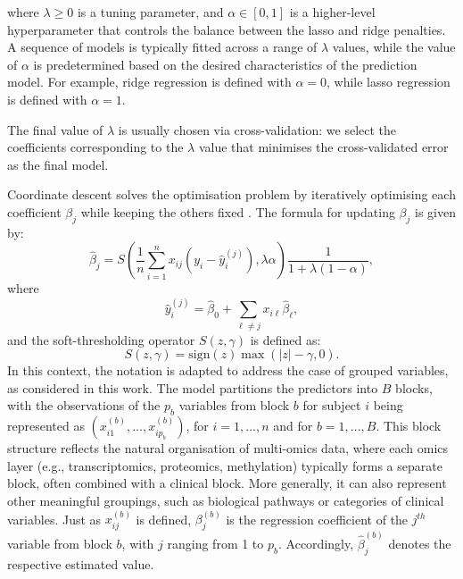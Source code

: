 \noindent where \(\lambda \geq 0\) is a tuning parameter, and \(\alpha \in [0, 1]\) is a higher-level hyperparameter that controls the balance between the lasso and ridge penalties.
A sequence of models is typically fitted across a range of 
\(\lambda\) values, while the value of  \(\alpha\)
 is predetermined based on the desired characteristics of the prediction model. For example, ridge regression \citep{Hoerl1970ridge} is defined with \(\alpha = 0\), while lasso regression \citep{tibshirani1996regression} is defined with \(\alpha = 1\). 

The final value of \(\lambda\) is usually chosen via cross-validation: we select the coefficients corresponding to the \(\lambda\) value that minimises the cross-validated error as the final model.

Coordinate descent solves the optimisation problem by iteratively optimising each coefficient \(\beta_j\)
 while keeping the others fixed \citep{friedman2010regularization}. 
 The formula for updating \(\beta_j\) is given by:\\
\[
\hat{\beta}_j = S\left(\frac{1}{n} \sum_{i=1}^n x_{ij} \left( y_i - \hat{y}_i^{(j)} \right), \lambda \alpha \right)  \frac{1}{1 + \lambda (1 - \alpha)},
\]
where
\[
\hat{y}_i^{(j)} = \hat{\beta}_0 + \sum_{\ell \neq j} x_{i\ell} \hat{\beta}_\ell,
\]
and the soft-thresholding operator \(S(z, \gamma)\) is defined as:
\[
S(z, \gamma) = \text{sign}(z) \max(|z| - \gamma, 0).
\]
In this context, the notation is adapted to address the case of grouped variables, as considered in this work. The model partitions the predictors into $B$ blocks, with the observations of the $p_{b}$ variables from block $b$ for subject $i$ being represented as $ (x_{i1}^{(b)}, . . . , x_{ip_{b}}^{(b)} )$, for $i=1,...,n$ and for $b = 1, . . . , B$. 
This block structure reflects the natural organisation of multi-omics data, where each omics layer (e.g., transcriptomics, proteomics, methylation) typically forms a separate block, often combined with a clinical block. More generally, it can also represent other meaningful groupings, such as biological pathways or categories of clinical variables. Just as \( x^{(b)}_{ij} \) is defined, \( \beta^{(b)}_{j} \) is the regression coefficient of the \( j^{th} \) variable from  block $b$, with \( j \) ranging from 1 to \( p_b \). Accordingly, \( \hat{\beta}^{(b)}_{j} \) denotes the respective estimated value.

